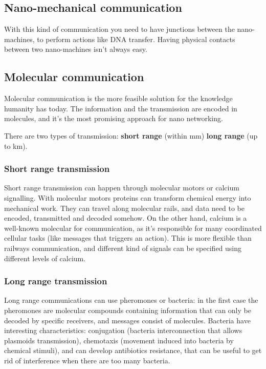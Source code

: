 \subsection{Nano-mechanical communication}

With this kind of communication you need to have junctions between the
nano-machines, to perform actions like DNA transfer. Having physical contacts
between two nano-machines isn't always easy.

\subsection{Molecular communication}

Molecular communication is the more feasible solution for the knowledge humanity
has today.
The information and the transmission are encoded in molecules, and it's the
most promising approach for nano networking.

There are two types of transmission: \textbf{short range} (within mm)
\textbf{long range} (up to km).

\subsubsection{Short range transmission}

Short range transmission can happen through molecular motors or calcium
signalling. With molecular motors proteins can transform chemical energy into
mechanical work. They can travel along molecular rails, and data need to be
encoded, transmitted and decoded somehow. On the other hand, calcium is a
well-known molecular for communication, as it's responsible for many coordinated
cellular tasks (like messages that triggers an action). This is more flexible
than railways communication, and different kind of signals can be specified
using different levels of calcium.

\subsubsection{Long range transmission}

Long range communications can use pheromones or bacteria: in the first case the
pheromones are molecular compounds containing information that can only be
decoded by specific receivers, and messages consist of molecules.
Bacteria have interesting characteristics: conjugation (bacteria interconnection
that allows plasmoids transmission), chemotaxis (movement induced into bacteria
by chemical stimuli), and can develop antibiotics resistance, that can be useful
to get rid of interference when there are too many bacteria.
